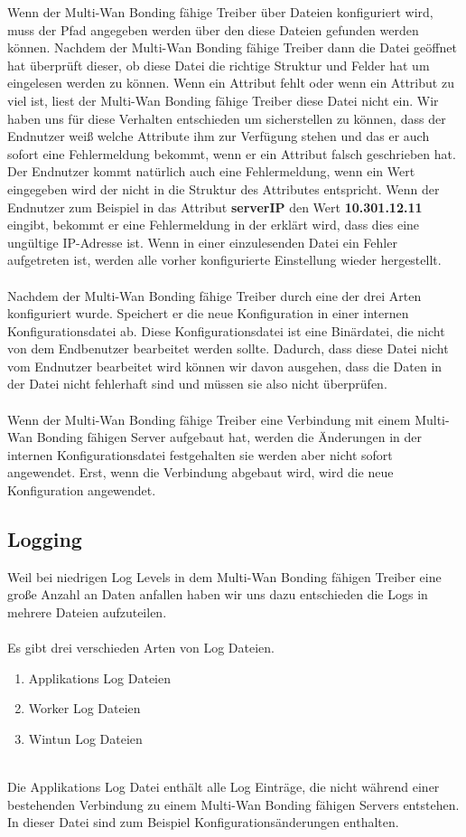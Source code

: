 \newpage
\noindent
Wenn der Multi-Wan Bonding fähige Treiber über Dateien konfiguriert wird, muss der Pfad angegeben werden über den diese Dateien gefunden werden können. Nachdem der Multi-Wan Bonding fähige Treiber dann die Datei geöffnet hat überprüft dieser, ob diese Datei die richtige Struktur und Felder hat um eingelesen werden zu können. Wenn ein Attribut fehlt oder wenn ein Attribut zu viel ist, liest der Multi-Wan Bonding fähige Treiber diese Datei nicht ein. Wir haben uns für diese Verhalten entschieden um sicherstellen zu können, dass der Endnutzer weiß welche Attribute ihm zur Verfügung stehen und das er auch sofort eine Fehlermeldung bekommt, wenn er ein Attribut falsch geschrieben hat. Der Endnutzer kommt natürlich auch eine Fehlermeldung, wenn ein Wert eingegeben wird der nicht in die Struktur des Attributes entspricht. Wenn der Endnutzer zum Beispiel in das Attribut \textbf{serverIP} den Wert \textbf{10.301.12.11} eingibt, bekommt er eine Fehlermeldung in der erklärt wird, dass dies eine ungültige IP-Adresse ist. Wenn in einer einzulesenden Datei ein Fehler aufgetreten ist, werden alle vorher konfigurierte Einstellung wieder hergestellt. 
\\\\
Nachdem der Multi-Wan Bonding fähige Treiber durch eine der drei Arten konfiguriert wurde. Speichert er die neue Konfiguration in einer internen Konfigurationsdatei ab. Diese Konfigurationsdatei ist eine Binärdatei, die nicht von dem Endbenutzer bearbeitet werden sollte. Dadurch, dass diese Datei nicht vom Endnutzer bearbeitet wird können wir davon ausgehen, dass die Daten in der Datei nicht fehlerhaft sind und müssen sie also nicht   überprüfen.
\\\\
Wenn der Multi-Wan Bonding fähige Treiber eine Verbindung mit einem Multi-Wan Bonding fähigen Server aufgebaut hat, werden die Änderungen in der internen Konfigurationsdatei festgehalten sie werden aber nicht sofort angewendet. Erst, wenn die Verbindung abgebaut wird, wird die neue Konfiguration angewendet.
\subsection{Logging}
Weil bei niedrigen Log Levels in dem Multi-Wan Bonding fähigen Treiber eine große Anzahl an Daten anfallen haben wir uns dazu entschieden die Logs in mehrere Dateien aufzuteilen.
\\\\
Es gibt drei verschieden Arten von Log Dateien.
\\
\begin{enumerate}
    \item Applikations Log Dateien
    \item Worker Log Dateien
    \item Wintun Log Dateien
\end{enumerate}
\ \\
Die Applikations Log Datei enthält alle Log Einträge, die nicht während einer bestehenden Verbindung zu einem Multi-Wan Bonding fähigen Servers entstehen. In dieser Datei sind zum Beispiel Konfigurationsänderungen enthalten.

